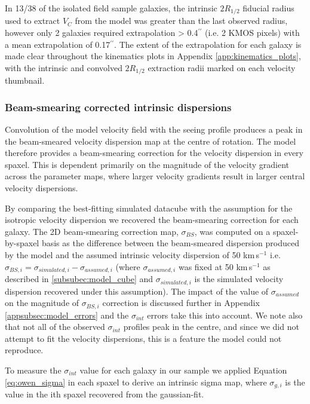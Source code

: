 \documentclass[fleqn,usenatbib]{mnras}
\begin{document}
\noindent
In 13/38 of the isolated field sample galaxies, the intrinsic $2R_{1/2}$ fiducial radius used to extract $V_{C}$ from the model was greater than the last observed radius, however only 2 galaxies required extrapolation > 0.4$^{\prime\prime}$ (i.e. 2 KMOS pixels) with a mean extrapolation of 0.17$^{\prime\prime}$.
The extent of the extrapolation for each galaxy is made clear throughout the kinematics plots in Appendix \ref{app:kinematics_plots}, with the intrinsic and convolved $2R_{1/2}$ extraction radii marked on each velocity thumbnail.

\subsubsection{Beam-smearing corrected intrinsic dispersions}\label{subsubsec:beam_smearing_corrected_dispersions}
Convolution of the model velocity field with the seeing profile produces a peak in the beam-smeared velocity dispersion map at the centre of rotation.
The model therefore provides a beam-smearing correction for the velocity dispersion in every spaxel.
This is dependent primarily on the magnitude of the velocity gradient across the parameter maps, where larger velocity gradients result in larger central velocity dispersions.

By comparing the best-fitting simulated datacube with the assumption for the isotropic velocity dispersion we recovered the beam-smearing correction for each galaxy.
The 2D beam-smearing correction map, $\sigma_{BS}$, was computed on a spaxel-by-spaxel basis as the difference between the beam-smeared dispersion produced by the model and the assumed intrinsic velocity dispersion of 50 km\,s$^{-1}$ i.e. $\sigma_{BS,i} = \sigma_{simulated,i} - \sigma_{assumed,i}$ (where $\sigma_{assumed,i}$ was fixed at 50 km\,s$^{-1}$ as described in \cref{subsubec:model_cube} and $\sigma_{simulated,i}$ is the simulated velocity dispersion recovered under this assumption).
The impact of the value of $\sigma_{assumed}$ on the magnitude of $\sigma_{BS,i}$ correction is discussed further in Appendix \ref{appsubsec:model_errors} and the $\sigma_{int}$ errors take this into account.
We note also that not all of the observed $\sigma_{int}$ profiles peak in the centre, and since we did not attempt to fit the velocity dispersions, this is a feature the model could not reproduce. 

To measure the $\sigma_{int}$ value for each galaxy in our sample we applied Equation \ref{eq:owen_sigma} in each spaxel to derive an intrinsic sigma map, where $\sigma_{g,i}$ is the value in the ith spaxel recovered from the gaussian-fit.
\end{document}

